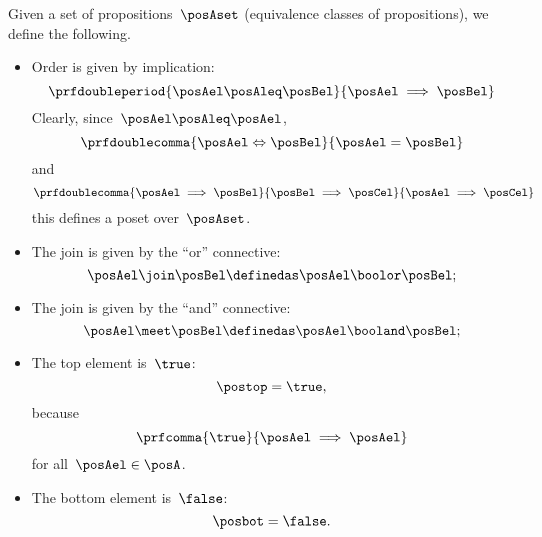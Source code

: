 \begin{ctdefinition}
	\label{def:prop-as-lattice}
	Given a set of propositions~$\posAset$ (equivalence classes of propositions), we define the following.
	\begin{itemize}
		\item Order is given by implication:
		      \begin{equation*}
			      \prfdoubleperiod{\posAel\posAleq \posBel}{\posAel \implies \posBel}
		      \end{equation*}
		      Clearly, since~$\posAel \posAleq \posAel$,
		      \begin{equation*}
			      \prfdoublecomma{\posAel \Leftrightarrow \posBel}{\posAel =\posBel}
		      \end{equation*}
		      and
		      \begin{equation*}
			      \prfdoublecomma{\posAel \implies \posBel}{\posBel \implies \posCel}{\posAel \implies \posCel}
		      \end{equation*}
		      this defines a poset over~$\posAset$.
		\item The join is given by the ``or'' connective:
		      \begin{equation*}
			      \posAel \join \posBel \definedas \posAel \boolor \posBel;
		      \end{equation*}
		\item The join is given by the ``and'' connective:
		      \begin{equation*}
			      \posAel \meet \posBel \definedas \posAel \booland \posBel;
		      \end{equation*}
		\item The top element is~$\true$:
		      \begin{equation*}
			      \postop = \true,
		      \end{equation*}
		      because
		      \begin{equation*}
			      \prfcomma{\true}{\posAel \implies \posAel}
		      \end{equation*}
		      for all~$\posAel\in \posA$.
		\item The bottom element is~$\false$:
		      \begin{equation*}
			      \posbot = \false.
		      \end{equation*}
	\end{itemize}
\end{ctdefinition}
\begin{marginfigure}
	\centering
	\caption{}
	\label{fig:prod_coprod_prop}
\end{marginfigure}

